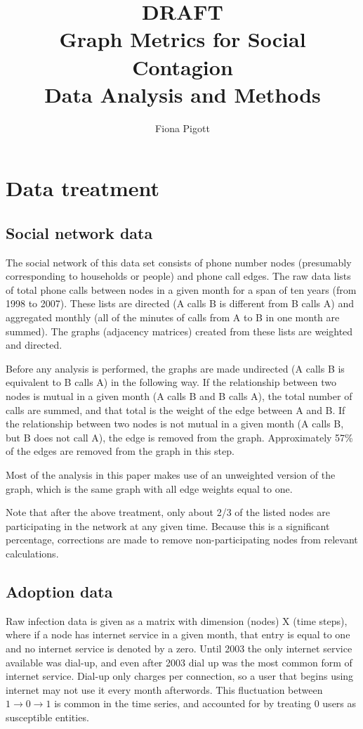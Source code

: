 \documentclass[12pt]{article}
\title{DRAFT \\ Graph Metrics for Social Contagion \\ Data Analysis and Methods}
\author{Fiona Pigott}
\begin{document}
\maketitle

\section{Data treatment}

\subsection{Social network data}

The social network of this data set consists of phone number nodes (presumably corresponding to households or people) and phone call edges. The raw data lists of total phone calls between nodes in a given month for a span of ten years (from 1998 to 2007). These lists are directed (A calls B is different from B calls A) and aggregated monthly (all of the minutes of calls from A to B in one month are summed). The graphs (adjacency matrices) created from these lists are weighted and directed.

Before any analysis is performed, the graphs are made undirected (A calls B is equivalent to B calls A) in the following way. If the relationship between two nodes is mutual in a given month (A calls B and B calls A), the total number of calls are summed, and that total is the weight of the edge between A and B. If the relationship between two nodes is not mutual in a given month (A calls B, but B does not call A), the edge is removed from the graph. Approximately 57\% of the edges are removed from the graph in this step.

Most of the analysis in this paper makes use of an unweighted version of the graph, which is the same graph with all edge weights equal to one.

Note that after the above treatment, only about 2/3 of the listed nodes are participating in the network at any given time. Because this is a significant percentage, corrections are made to remove non-participating nodes from relevant calculations.

\subsection{Adoption data}
Raw infection data is given as a matrix with dimension (nodes) X (time steps), where if a node has internet service in a given month, that entry is equal to one and no internet service is denoted by a zero. Until 2003 the only internet service available was dial-up, and even after 2003 dial up was the most common form of internet service. Dial-up only charges per connection, so a user that begins using internet may not use it every month afterwords. This fluctuation between \(1 \rightarrow 0 \rightarrow 1\) is common in the time series, and accounted for by treating \(0\) users as susceptible entities.
\end{document}
